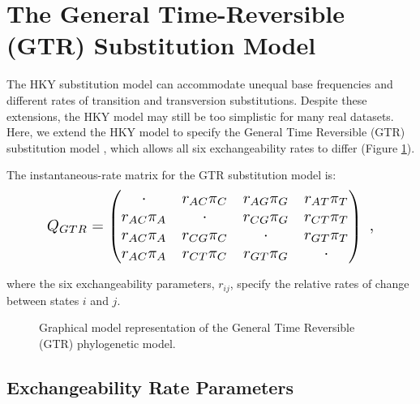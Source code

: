 \section{The General Time-Reversible (GTR) Substitution Model}

The HKY substitution model can accommodate unequal base frequencies and different rates of transition and transversion substitutions.
Despite these extensions, the HKY model may still be too simplistic for many real datasets.
Here, we extend the HKY model to specify the General Time Reversible (GTR) substitution model \citep{Tavare1986}, which allows all six exchangeability rates to differ (Figure \ref{fig:gtr}).

The instantaneous-rate matrix for the GTR substitution model is:
\begin{equation*}
\resizebox{4in}{!}{%
$Q_{GTR} = \begin{pmatrix}
{\cdot}	   & {r_{AC}\pi_C} & {r_{AG}\pi_G} & {r_{AT}\pi_T} \\
{r_{AC}\pi_A} & {\cdot}       & {r_{CG}\pi_G} & {r_{CT}\pi_T} \\
{r_{AC}\pi_A} & {r_{CG}\pi_C} & {\cdot}       & {r_{GT}\pi_T} \\
{r_{AC}\pi_A} & {r_{CT}\pi_C} & {r_{GT}\pi_G} & {\cdot}       \\
\end{pmatrix} \mbox{  ,} $}
\end{equation*}

where the six exchangeability parameters, $r_{ij}$, specify the relative rates of change between states $i$ and $j$.  


\begin{figure}[h!]
\centering
{}
\caption{\small Graphical model representation of the General Time Reversible (GTR) phylogenetic model.}
\label{fig:gtr}
\end{figure}


\subsection{Exchangeability Rate Parameters}

